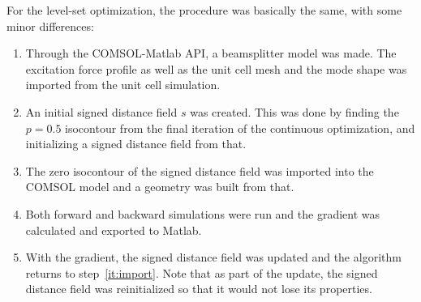 For the level-set optimization, the procedure was basically the same, with some
minor differences:
\begin{enumerate}
	\item Through the COMSOL-Matlab API, a beamsplitter model was made.
		The excitation force profile as well as the unit cell mesh and the mode
		shape was imported from the unit cell simulation.
	\item An initial signed distance field $s$ was created.
		This was done by finding the $p=0.5$ isocontour from the final iteration
		of the continuous optimization, and initializing a signed distance field
		from that.
	\item\label{it:import} The zero isocontour of the signed distance field was imported into
		the COMSOL model and a geometry was built from that.
	\item Both forward and backward simulations were run and the gradient was
		calculated and exported to Matlab.
	\item With the gradient, the signed distance field was updated and the algorithm
		returns to step~\ref{it:import}.
		Note that as part of the update, the signed distance field was
		reinitialized so that it would not lose its properties.
\end{enumerate}
